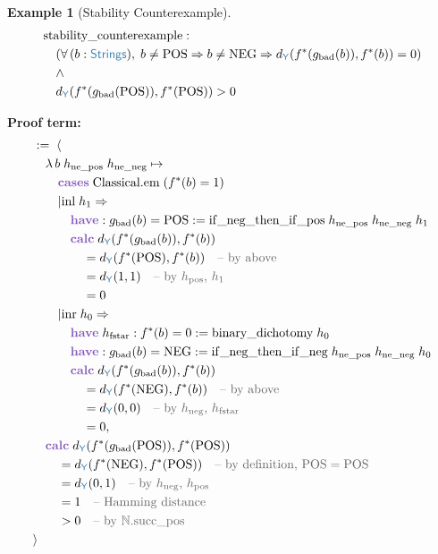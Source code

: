 \documentclass[11pt]{article}
\theoremstyle{definition}
\newtheorem{exampleenv}{Example}
\theoremstyle{plain}
\newcommand{\kw}[1]{\textcolor{keyword}{\textbf{#1}}}
\newcommand{\ty}[1]{\textcolor{type}{\mathsf{#1}}}
\newcommand{\fn}[1]{\mathrm{#1}}
\newcommand{\cmt}[1]{\textcolor{comment}{\text{-- #1}}}
\newcommand{\lam}{\lambda\,}
\newcommand{\all}{\forall\,}
\newcommand{\Arr}{\Rightarrow}
\newcommand{\pf}{:=\;}
\newcommand{\Strings}{\ty{Strings}}
\newcommand{\Y}{\ty{Y}}
\newcommand{\N}{\mathbb{N}}
\newcommand{\fstar}{f^*}
\newcommand{\dY}{d_{\Y}}
\begin{document}
\begin{exampleenv}[Stability Counterexample]
\label{ex:stability}
\begin{align*}
&\fn{stability\_counterexample} : \\
&\quad (\all (b : \Strings),\; b \neq \fn{POS} \Arr b \neq \fn{NEG} \Arr \dY(\fstar(g_{\text{bad}}(b)), \fstar(b)) = 0) \\
&\quad \land \\
&\quad \dY(\fstar(g_{\text{bad}}(\fn{POS})), \fstar(\fn{POS})) > 0
\end{align*}

\textbf{Proof term:}
\begin{align*}
&\pf \langle \\
&\quad \lam b\; h_{\text{ne\_pos}}\; h_{\text{ne\_neg}} \mapsto \\
&\quad\quad \kw{cases}\; \fn{Classical.em}\; (\fstar(b) = 1) \\
&\quad\quad | \fn{inl}\; h_1 \Rightarrow \\
&\quad\quad\quad \kw{have} : g_{\text{bad}}(b) = \fn{POS} := \fn{if\_neg\_then\_if\_pos}\; h_{\text{ne\_pos}}\; h_{\text{ne\_neg}}\; h_1 \\
&\quad\quad\quad \kw{calc}\; \dY(\fstar(g_{\text{bad}}(b)), \fstar(b)) \\
&\quad\quad\quad\quad = \dY(\fstar(\fn{POS}), \fstar(b)) \quad\cmt{by above} \\
&\quad\quad\quad\quad = \dY(1, 1) \quad\cmt{by $h_{\text{pos}}$, $h_1$} \\
&\quad\quad\quad\quad = 0 \\
&\quad\quad | \fn{inr}\; h_0 \Rightarrow \\
&\quad\quad\quad \kw{have}\; h_{\text{fstar}} : \fstar(b) = 0 := \fn{binary\_dichotomy}\; h_0 \\
&\quad\quad\quad \kw{have} : g_{\text{bad}}(b) = \fn{NEG} := \fn{if\_neg\_then\_if\_neg}\; h_{\text{ne\_pos}}\; h_{\text{ne\_neg}}\; h_0 \\
&\quad\quad\quad \kw{calc}\; \dY(\fstar(g_{\text{bad}}(b)), \fstar(b)) \\
&\quad\quad\quad\quad = \dY(\fstar(\fn{NEG}), \fstar(b)) \quad\cmt{by above} \\
&\quad\quad\quad\quad = \dY(0, 0) \quad\cmt{by $h_{\text{neg}}$, $h_{\text{fstar}}$} \\
&\quad\quad\quad\quad = 0, \\
&\quad \kw{calc}\; \dY(\fstar(g_{\text{bad}}(\fn{POS})), \fstar(\fn{POS})) \\
&\quad\quad = \dY(\fstar(\fn{NEG}), \fstar(\fn{POS})) \quad\cmt{by definition, $\fn{POS} = \fn{POS}$} \\
&\quad\quad = \dY(0, 1) \quad\cmt{by $h_{\text{neg}}$, $h_{\text{pos}}$} \\
&\quad\quad = 1 \quad\cmt{Hamming distance} \\
&\quad\quad > 0 \quad\cmt{by $\N.\fn{succ\_pos}$} \\
&\rangle
\end{align*}
\end{exampleenv}
\end{document}
